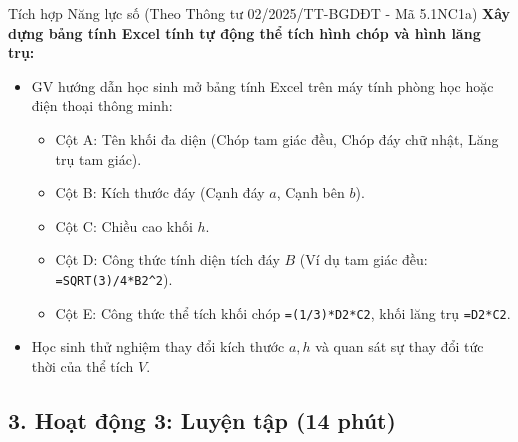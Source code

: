 \documentclass[12pt, a4paper]{article}
\begin{document}
\begin{aibox}{Tích hợp Năng lực số (Theo Thông tư 02/2025/TT-BGDĐT - Mã 5.1NC1a)}
    \textbf{Xây dựng bảng tính Excel tính tự động thể tích hình chóp và hình lăng trụ:}
    \begin{itemize}[leftmargin=0.6cm]
        \item GV hướng dẫn học sinh mở bảng tính Excel trên máy tính phòng học hoặc điện thoại thông minh:
        \begin{itemize}
            \item Cột A: Tên khối đa diện (Chóp tam giác đều, Chóp đáy chữ nhật, Lăng trụ tam giác).
            \item Cột B: Kích thước đáy (Cạnh đáy $a$, Cạnh bên $b$).
            \item Cột C: Chiều cao khối $h$.
            \item Cột D: Công thức tính diện tích đáy $B$ (Ví dụ tam giác đều: \texttt{=SQRT(3)/4*B2\textasciicircum 2}).
            \item Cột E: Công thức thể tích khối chóp \texttt{=(1/3)*D2*C2}, khối lăng trụ \texttt{=D2*C2}.
        \end{itemize}
        \item Học sinh thử nghiệm thay đổi kích thước $a, h$ và quan sát sự thay đổi tức thời của thể tích $V$.
    \end{itemize}
\end{aibox}

\subsection*{3. Hoạt động 3: Luyện tập (14 phút)}
\end{document}
